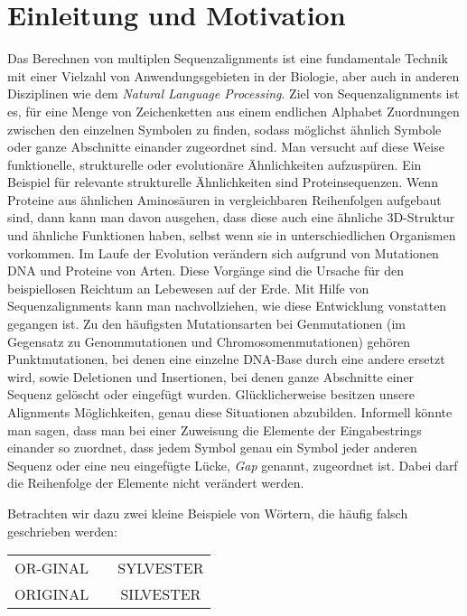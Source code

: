 \chapter{Einleitung und Motivation}
\label{ch:einleitung}

Das Berechnen von multiplen Sequenzalignments ist eine fundamentale Technik mit einer Vielzahl von Anwendungsgebieten in der Biologie, aber auch in anderen Disziplinen wie dem \emph{Natural Language Processing}. Ziel von Sequenzalignments ist es, für eine Menge von Zeichenketten aus einem endlichen Alphabet Zuordnungen zwischen den einzelnen Symbolen zu finden, sodass möglichst ähnlich Symbole oder ganze Abschnitte einander zugeordnet sind. Man versucht auf diese Weise funktionelle, strukturelle oder evolutionäre Ähnlichkeiten aufzuspüren. Ein Beispiel für relevante strukturelle Ähnlichkeiten sind Proteinsequenzen. Wenn Proteine aus ähnlichen Aminosäuren in vergleichbaren Reihenfolgen aufgebaut sind, dann kann man davon ausgehen, dass diese auch eine ähnliche 3D-Struktur und ähnliche Funktionen haben, selbst wenn sie in unterschiedlichen Organismen vorkommen. Im Laufe der Evolution verändern sich aufgrund von Mutationen DNA und Proteine von Arten. Diese Vorgänge sind die Ursache für den beispiellosen Reichtum an Lebewesen auf der Erde. Mit Hilfe von Sequenzalignments kann man nachvollziehen, wie diese Entwicklung vonstatten gegangen ist. Zu den häufigsten Mutationsarten bei Genmutationen (im Gegensatz zu Genommutationen und Chromosomenmutationen) gehören Punktmutationen, bei denen eine einzelne DNA-Base durch eine andere ersetzt wird, sowie Deletionen und Insertionen, bei denen ganze Abschnitte einer Sequenz gelöscht oder eingefügt wurden. Glücklicherweise besitzen unsere Alignments Möglichkeiten, genau diese Situationen abzubilden. Informell könnte man sagen, dass man bei einer Zuweisung die Elemente der Eingabestrings einander so zuordnet, dass jedem Symbol genau ein Symbol jeder anderen Sequenz oder eine neu eingefügte Lücke, \emph{Gap} genannt, zugeordnet ist. Dabei darf die Reihenfolge der Elemente nicht verändert werden.

Betrachten wir dazu zwei kleine Beispiele von Wörtern, die häufig falsch geschrieben werden:

\ttfamily
\begin{center}
\begin{tabular}{ccc}
		OR-GINAL & \hspace{2cm} & SYLVESTER \\
		ORIGINAL & \hspace{2cm} & SILVESTER
\end{tabular}
\end{center}
\normalfont

